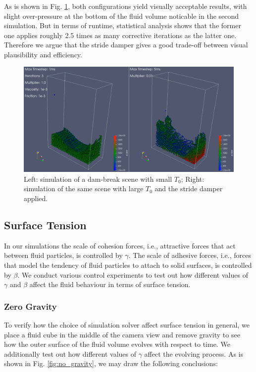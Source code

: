 \documentclass[
	11pt, 
	DIV10,
	ngerman,
	a4paper, 
	oneside, 
	headings=normal, 
	captions=tableheading,
	final, 
	numbers=noenddot
]{scrartcl}
\begin{document}
As is shown in Fig. \ref{fig:strideDamper}, both configurations yield visually acceptable results, with slight over-pressure at the bottom of the fluid volume noticable in the second simulation. But in terms of runtime, statistical analysis shows that the former one applies roughly 2.5 times as many corrective iterations as the latter one. Therefore we argue that the stride damper gives a good trade-off between visual plausibility and efficiency.

\begin{figure}[h]
    \centering
    \includegraphics[width=.6\textwidth]{pics/pbf_stride_damper.png}
    \caption{Left: simulation of a dam-break scene with small $ T_{0} $; Right: simulation of the same scene with large $ T_{0} $ and the stride damper applied.}
    \label{fig:strideDamper}
\end{figure}

\subsection{Surface Tension}

In our simulations the scale of cohesion forces, i.e., attractive forces that act between fluid particles, is controlled by $ \gamma $. The scale of adhesive forces, i.e., forces that model the tendency of fluid particles to attach to solid surfaces, is controlled by $ \beta $. We conduct various control experiments to test out how different values of $ \gamma $ and $ \beta $ affect the fluid behaviour in terms of surface tension.

\subsubsection{Zero Gravity}

To verify how the choice of simulation solver affect surface tension in general, we place a fluid cube in the middle of the camera view and remove gravity to see how the outer surface of the fluid volume evolves with respect to time. We additionally test out how different values of $ \gamma $ affect the evolving process. As is shown in Fig. \ref{fig:no_gravity}, we may draw the following conclusions:
\end{document}

